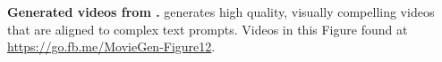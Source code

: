 
\begin{center}
    \centering
    \captionsetup{type=figure}
    
    \vspace{-3mm}
    \caption{\textbf{Generated videos from \OursVideo.} 
    \OursVideo generates high quality, visually compelling videos that are aligned to complex text prompts.
    Videos in this Figure found at \url{https://go.fb.me/MovieGen-Figure12}.}
    \label{fig:t2v_qual_ours_figure}
\end{center}%
